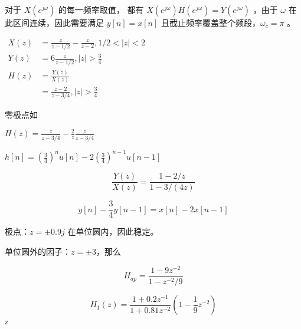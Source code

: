 \documentclass[lang=cn,11pt,a4paper,cite=authoryear,twocolumn]{elegantpaper}
\begin{document}
对于 \(X(e^{j\omega})\) 的每一频率取值，
都有 \(X(e^{j\omega}) H(e^{j\omega}) = Y(e^{j\omega})\) ，由于 \(\omega\) 在此区间连续，因此需要满足 \(y[n] = x[n]\) 且截止频率覆盖整个频段，\(\omega_c = \pi\) 。



\(\begin{aligned}
    X(z) &= \frac{z}{z-1/2}-\frac{z}{z-2}, 1/2 < |z| < 2\\
    Y(z) &= 6 \frac{z}{z-1/2} , |z| > \frac{3}{4}\\
    H(z) &= \frac{Y(z)}{X(z)} \\
    &= \frac{z-2}{z-3/4}, |z| > \frac{3}{4}
\end{aligned}\)

零极点如 



\(H(z) = \frac{z}{z-3/4} - \frac{2}{z}\frac{z}{z-3/4}\)

\(h[n] = (\frac{3}{4})^n u[n] - 2 (\frac{3}{4})^{n-1} u[n-1]\)


\[\frac{Y(z)}{X(z)} = \frac{1-2/z}{1-3/(4z)}\]

\[y[n] - \frac{3}{4}y[n-1] = x[n] - 2 x[n-1]\]



极点：\(z=\pm 0.9 j\) 在单位圆内，因此稳定。


单位圆外的因子：\(z=\pm 3\)，那么

\[H_{ap} = \frac{1-9z^{-2}}{1-z^{-2}/9}\]

\[H_1(z) = \frac{1+0.2z^{-1}}{1+0.81z^{-2}} (1-\frac{1}{9}z^{-2})\]z




\end{document}
